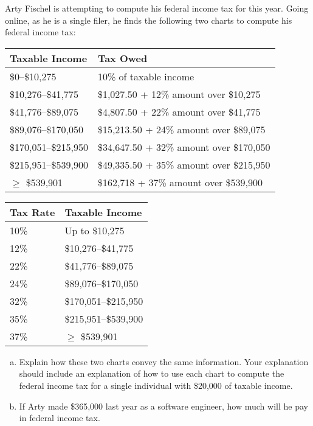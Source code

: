 \documentclass[11pt,letterpaper]{article}
\begin{document}
 Arty Fischel is attempting to compute his federal income tax for this year. Going online, as he is a single filer, he finds the following two charts to compute his federal income tax: \par
	\begin{table}[!ht]
	\centering
	\begin{tabular}{|l|l|} \hline
	Taxable Income & Tax Owed \\ \hline \hline
	\$0--\$10,275 & 10\% of taxable income \\ \hline
	\$10,276--\$41,775 & \$1,027.50 + 12\% amount over \$10,275 \\ \hline
	\$41,776--\$89,075 & \$4,807.50 + 22\% amount over \$41,775 \\ \hline
	\$89,076--\$170,050 & \$15,213.50 + 24\% amount over \$89,075 \\ \hline
	\$170,051--\$215,950 & \$34,647.50 + 32\% amount over \$170,050 \\ \hline
	\$215,951--\$539,900 & \$49,335.50 + 35\% amount over \$215,950 \\ \hline
	$\geq$ \$539,901 & \$162,718 + 37\% amount over \$539,900 \\ \hline
	\end{tabular}
	\end{table}

	\begin{table}[!ht]
	\centering
	\begin{tabular}{|l|l|} \hline
	Tax Rate & Taxable Income \\ \hline \hline
	10\% & Up to \$10,275 \\ \hline
	12\% & \$10,276--\$41,775 \\ \hline
	22\% & \$41,776--\$89,075 \\ \hline
	24\% & \$89,076--\$170,050 \\ \hline
	32\% & \$170,051--\$215,950 \\ \hline
	35\% & \$215,951--\$539,900 \\ \hline
	37\% & $\geq$ \$539,901 \\ \hline
	\end{tabular}
	\end{table}	

\begin{enumerate}[(a)]
\item Explain how these two charts convey the same information. Your explanation should include an explanation of how to use each chart to compute the federal income tax for a single individual with \$20,000 of taxable income.
\item If Arty made \$365,000 last year as a software engineer, how much will he pay in federal income tax.
\end{enumerate}
	
\end{document}
